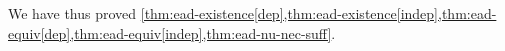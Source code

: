\documentclass[a4paper]{article}
\newtheorem{proposition}[theorem]{Proposition}
\renewcommand\P{\mathbb{P}} %
\newcommand\EU{\mathrm{EU}}
\newcommand\EAd{\mathrm{EAd}}
\newcommand{\D}{\mathcal{D}}
\newcommand{\Decs}{\mathcal{D}}
\renewcommand\S{\mathcal{S}}
\newcommand\s{\mathsf{s}}
\newcommand{\n}{\mathsf{n}}
\newcommand\Nu{\mathcal{N}}
\newcommand{\IB}{\mathbb{B}}
\newcommand{\IP}{\P}
\newcommand{\Strategies}{\S}
\newenvironment{CCM rewritten}
{\begingroup\color{blue}} %
{\endgroup}              %
\begin{document}
We have thus proved \cref{thm:ead-existence[dep],thm:ead-existence[indep],thm:ead-equiv[dep],thm:ead-equiv[indep],thm:ead-nu-nec-suff}. 


%
%
%	
%	
%
%
%	
%
%	
%	
\end{document}

